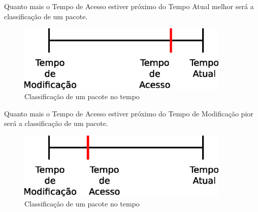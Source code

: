 \begin{frame}

    Quanto mais o Tempo de Acesso estiver próximo do Tempo Atual
melhor será a classificação de um pacote.
    \begin{figure}[h]
      \centering
      \includegraphics[width=0.9\textwidth]{figura/barra_temporal_02.eps}
      \caption{Classificação de um pacote no tempo}
      \label{fig:barra_temporal}
    \end{figure}

\end{frame}


\begin{frame}

    Quanto mais o Tempo de Acesso estiver próximo do Tempo de Modificação
pior será a classificação de um pacote.
    \begin{figure}[h]
      \centering
      \includegraphics[width=0.9\textwidth]{figura/barra_temporal_03.eps}
      \caption{Classificação de um pacote no tempo}
      \label{fig:barra_temporal}
    \end{figure}

\end{frame}


